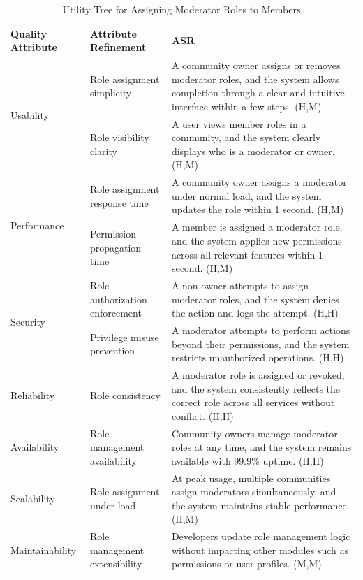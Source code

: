 \documentclass{article}
\begin{document}
\begin{table}[H]
\centering
\caption{Utility Tree for Assigning Moderator Roles to Members}
\begin{tabular}{|p{3cm}|p{4cm}|p{7cm}|}
\hline
\textbf{Quality Attribute} & \textbf{Attribute Refinement} & \textbf{ASR} \\
\hline

\multirow{2}{*}{Usability}
& Role assignment simplicity
& A community owner assigns or removes moderator roles, and the system allows completion through a clear and intuitive interface within a few steps. (H,M) \\
\cline{2-3}
& Role visibility clarity
& A user views member roles in a community, and the system clearly displays who is a moderator or owner. (H,M) \\
\hline

\multirow{2}{*}{Performance}
& Role assignment response time
& A community owner assigns a moderator under normal load, and the system updates the role within 1 second. (H,M) \\
\cline{2-3}
& Permission propagation time
& A member is assigned a moderator role, and the system applies new permissions across all relevant features within 1 second. (H,M) \\
\hline

\multirow{2}{*}{Security}
& Role authorization enforcement
& A non-owner attempts to assign moderator roles, and the system denies the action and logs the attempt. (H,H) \\
\cline{2-3}
& Privilege misuse prevention
& A moderator attempts to perform actions beyond their permissions, and the system restricts unauthorized operations. (H,H) \\
\hline

Reliability
& Role consistency
& A moderator role is assigned or revoked, and the system consistently reflects the correct role across all services without conflict. (H,H) \\
\hline

Availability
& Role management availability
& Community owners manage moderator roles at any time, and the system remains available with 99.9\% uptime. (H,H) \\
\hline

Scalability
& Role assignment under load
& At peak usage, multiple communities assign moderators simultaneously, and the system maintains stable performance. (H,M) \\
\hline

Maintainability
& Role management extensibility
& Developers update role management logic without impacting other modules such as permissions or user profiles. (M,M) \\
\hline


\end{tabular}
\end{table}
\end{document}
